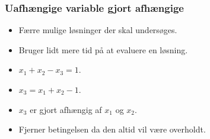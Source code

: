 \documentclass[12pt]{beamer}
\begin{document}

\begin{frame}
\frametitle{Uafhængige variable gjort afhængige}
\begin{itemize}[<+->]
\item Færre mulige løsninger der skal undersøges.
\item Bruger lidt mere tid på at evaluere en løsning.
\item $x_1 +x_2 -x_3 = 1$.
\item $x_3 = x_1 +x_2 -1$.
\item $x_3$ er gjort afhængig af $x_1$ og $x_2$. 
\item Fjerner betingelsen da den altid vil være overholdt.
\end{itemize}

\end{frame}

\end{document}
